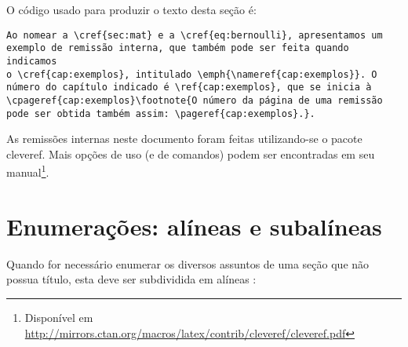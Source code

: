 O código usado para produzir o texto desta seção é:
\begin{verbatim}
Ao nomear a \cref{sec:mat} e a \cref{eq:bernoulli}, apresentamos um 
exemplo de remissão interna, que também pode ser feita quando indicamos
o \cref{cap:exemplos}, intitulado \emph{\nameref{cap:exemplos}}. O
número do capítulo indicado é \ref{cap:exemplos}, que se inicia à
\cpageref{cap:exemplos}\footnote{O número da página de uma remissão 
pode ser obtida também assim: \pageref{cap:exemplos}.}.
\end{verbatim}

As remissões internas neste documento foram feitas utilizando-se o pacote \textsf{cleveref}. Mais opções de uso (e de comandos) podem ser encontradas em seu manual\footnote{Disponível em \url{http://mirrors.ctan.org/macros/latex/contrib/cleveref/cleveref.pdf}}.

\section{Enumerações: alíneas e subalíneas}

Quando for necessário enumerar os diversos assuntos de uma seção que não possua título, esta deve ser
subdividida em alíneas \cite[seção 4.2]{NBR6024:2012}:

